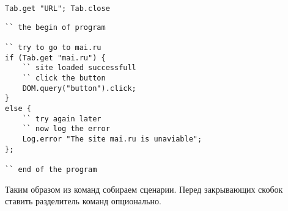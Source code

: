 \begin{lstlisting}[numbers=none]
Tab.get "URL"; Tab.close
\end{lstlisting}

\begin{lstlisting}[caption=Koд с пробельных символов,label=readable]
`` the begin of program

`` try to go to mai.ru
if (Tab.get "mai.ru") {
	`` site loaded successfull
	`` click the button
	DOM.query("button").click;
}
else {
	`` try again later
	`` now log the error
	Log.error "The site mai.ru is unaviable";
};

`` end of the program
\end{lstlisting}

Таким образом из команд собираем сценарии. Перед закрывающих скобок ставить разделитель команд опционально.